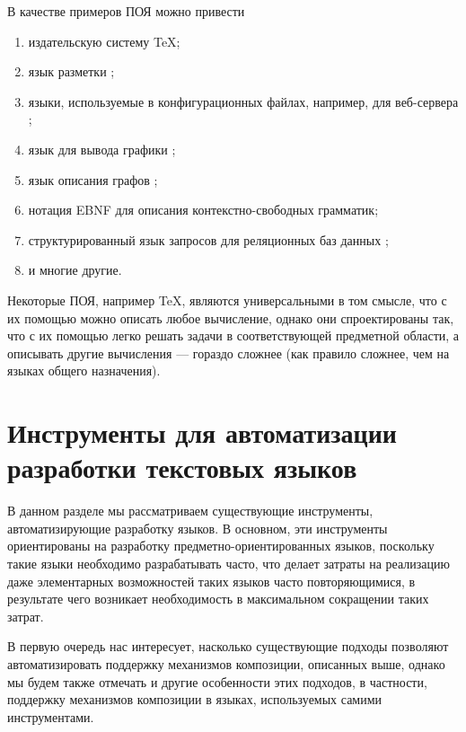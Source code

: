 В качестве примеров ПОЯ можно привести
\begin{enumerate}
\item издательскую систему \TeX ;
\item язык разметки ;
\item языки, используемые в конфигурационных файлах, например, для веб-сервера ;
\item язык для вывода графики ;
\item язык описания графов ;
\item нотация EBNF для описания контекстно-свободных грамматик;
\item структурированный язык запросов для реляционных баз данных ;
\item и многие другие.
\end{enumerate}

Некоторые ПОЯ, например \TeX , являются универсальными в том смысле, что с их помощью можно описать любое вычисление, однако они спроектированы так, что с их помощью легко решать задачи в соответствующей предметной области, а описывать другие вычисления --- гораздо сложнее (как правило сложнее, чем на языках общего назначения).



\chapter{Инструменты для автоматизации разработки текстовых языков}

В данном разделе мы рассматриваем существующие инструменты, автоматизирующие разработку языков. В основном, эти инструменты ориентированы на разработку предметно-ориентированных языков, поскольку такие языки необходимо разрабатывать часто, что делает затраты на реализацию даже элементарных возможностей таких языков часто повторяющимися, в результате чего возникает необходимость в максимальном сокращении таких затрат.

В первую очередь нас интересует, насколько существующие подходы позволяют автоматизировать поддержку механизмов композиции, описанных выше, однако мы будем также отмечать и другие особенности этих подходов, в частности, поддержку механизмов композиции в языках, используемых самими инструментами.

